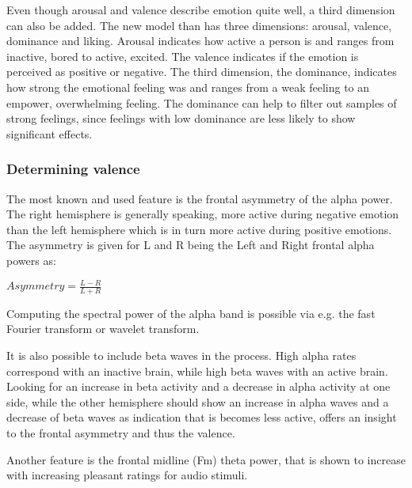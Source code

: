 \npar
Even though arousal and valence describe emotion quite well, a third dimension can also be added. The new model than has three dimensions: arousal, valence, dominance and liking. Arousal indicates how active a person is and ranges from inactive, bored to active, excited. The valence indicates if the emotion is perceived as positive or negative. The third dimension, the dominance, indicates how strong the emotional feeling was and ranges from a weak feeling to an empower, overwhelming feeling. The dominance can help to filter out samples of strong feelings, since feelings with low dominance are less likely to show significant effects.


\subsubsection{Determining valence}
\label{DetValence}

The most known and used feature is the frontal asymmetry of the alpha power\cite{GivenPaper}.
The right hemisphere is generally speaking, more active during negative emotion than the left hemisphere which is in turn more active during positive emotions\cite{RealTimeEEGEmotion,EEGDatasets}. The asymmetry is given for L and R being the Left and Right frontal alpha powers as:\\
\begin{center}
$Asymmetry = \frac{L-R}{L+R}$
\end{center}
Computing the spectral power of the alpha band is possible via e.g. the fast Fourier transform or wavelet transform.

\npar

It is also possible to include beta waves in the process. High alpha rates correspond with an inactive brain, while high beta waves with an active brain. Looking for an increase in beta activity and a decrease in alpha activity at one side, while the other hemisphere should show an increase in alpha waves and a decrease of beta waves as indication that is becomes less active, offers an insight to the frontal asymmetry and thus the valence\cite{ExtendedPaper}. 

\npar

Another feature is the frontal midline (Fm) theta power, that is shown to increase with increasing pleasant ratings for audio stimuli\cite{MusicPaper}. %


